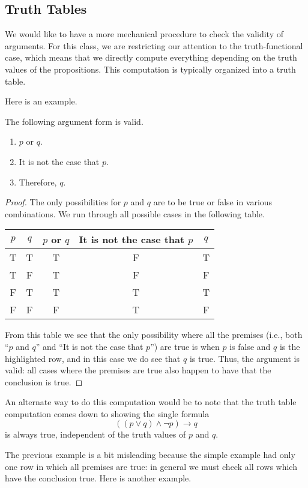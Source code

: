 \documentclass[../notes.tex]{subfiles}
\begin{document}
\subsection{Truth Tables}
We would like to have a more mechanical procedure to check the validity of arguments. For this class, we are restricting our attention to the truth-functional case, which means that we directly compute everything depending on the truth values of the propositions. This computation is typically organized into a truth table.

Here is an example.
\begin{exe}
	The following argument form is valid.
	\begin{enumerate}
		\item $p$ or $q$.
		\item It is not the case that $p$.
		\item Therefore, $q$.
	\end{enumerate}
\end{exe}
\begin{proof}
	The only possibilities for $p$ and $q$ are to be true or false in various combinations. We run through all possible cases in the following table.
	\begin{center}
		\begin{tabular}{c|c||c|c||c}
			$p$ & $q$ & $p$ or $q$ & It is not the case that $p$ & $q$ \\\hline
			T & T & T & F & T \\
			T & F & T & F & F \\
			\color{red}F & \color{red}T & \color{red}T & \color{red}T & \color{red}T \\
			F & F & F & T & F
		\end{tabular}
	\end{center}
	From this table we see that the only possibility where all the premises (i.e., both ``$p$ and $q$'' and ``It is not the case that $p$'') are true is when $p$ is false and $q$ is the highlighted row, and in this case we do see that $q$ is true. Thus, the argument is valid: all cases where the premises are true also happen to have that the conclusion is true.
\end{proof}
\begin{remark}
	An alternate way to do this computation would be to note that the truth table computation comes down to showing the single formula
	\[((p\lor q)\land\lnot p)\to q\]
	is always true, independent of the truth values of $p$ and $q$.
\end{remark}
The previous example is a bit misleading because the simple example had only one row in which all premises are true: in general we must check all rows which have the conclusion true. Here is another example.
\end{document}
